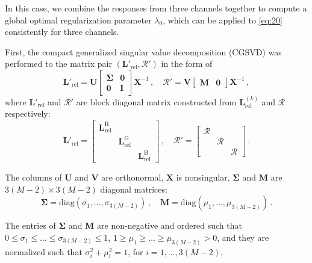 \documentclass[9pt,twocolumn,twoside]{osajnl}
\begin{document}
In this case, we combine the responses from three channels together to compute a global optimal regularization parameter $\lambda_0$, which can be applied to \eqref{eq:20} consistently for three channels.

First, the compact generalized singular value decomposition (CGSVD) was performed to the matrix pair $\left(\mathbf{L}'_\text{rel}, \mathcal{R}'\right)$ in the form of
\begin{equation}
\mathbf{L}'_\text{rel} = \mathbf{U}%
\begin{bmatrix}
\mathbf{\Sigma} & \mathbf{0} \\
\mathbf{0}		& \mathbf{I}
\end{bmatrix}%
\mathbf{X}^{-1}\,,\quad%
\mathcal{R}' = \mathbf{V}%
\begin{bmatrix}
\mathbf{M} & \mathbf{0}
\end{bmatrix}%
\mathbf{X}^{-1}\,,
\label{eq:21}
\end{equation}
where $\mathbf{L}'_\text{rel}$ and $\mathcal{R}'$ are block diagonal matrix constructed from $\mathbf{L}_\text{rel}^{(k)}$ and $\mathcal{R}$ respectively:
\begin{equation}
\mathbf{L}'_\text{rel} =%
\begin{bmatrix}
\mathbf{L}_\text{rel}^\text{R} & 								& \\
& \mathbf{L}_\text{rel}^\text{G} & \\
&								& \mathbf{L}_\text{rel}^\text{B}
\end{bmatrix}\,,\quad%
\mathcal{R}' =%
\begin{bmatrix}
\mathcal{R} &			  &	\\
& \mathcal{R} & \\
&			  & \mathcal{R}
\end{bmatrix}\,.
\label{eq:22}
\end{equation}

The columns of $\mathbf{U}$ and $\mathbf{V}$ are orthonormal, $\mathbf{X}$ is nonsingular, $\mathbf{\Sigma}$ and $\mathbf{M}$ are $3(M-2)\times3(M-2)$ diagonal matrices:
\begin{equation*}
\mathbf{\Sigma} = \text{diag}(\sigma_1,\ldots,\sigma_{3(M-2)})\,,\quad%
\mathbf{M} = \text{diag}(\mu_1,\ldots,\mu_{3(M-2)})\,.
\end{equation*}

The entries of $\mathbf{\Sigma}$ and $\mathbf{M}$ are non-negative and ordered such that $0\le\sigma_1\le\ldots\le\sigma_{3(M-2)}\le1$, $1\ge\mu_1\ge\ldots\ge\mu_{3(M-2)}>0$, and they are normalized such that $\sigma_i^2 + \mu_i^2 = 1$, for $i = 1,\ldots,3(M-2)$.
\end{document}
